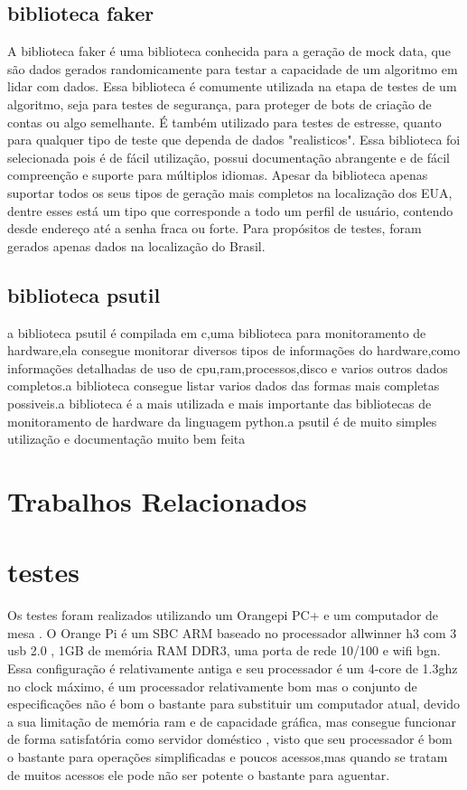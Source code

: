 \documentclass[
	12pt,				%
	openright,			%
	oneside,			%
	a4paper,			%
	english,			%
	french,				%
	spanish,			%
	brazil,				%
	]{abntex2}
\begin{document}
\section{biblioteca faker}
\label{sec:biblioteca faker}
A biblioteca faker é uma biblioteca conhecida para a geração de mock data, que são dados gerados randomicamente para testar a capacidade de um algoritmo em lidar com dados. Essa biblioteca é comumente utilizada na etapa de testes de um algoritmo, seja para testes de segurança, para proteger de bots de criação de contas ou algo semelhante. É também utilizado para testes de estresse, quanto para qualquer tipo de teste que dependa de dados "realisticos".\newline
Essa biblioteca foi selecionada pois é de fácil utilização, possui documentação abrangente e de fácil compreenção e suporte para múltiplos idiomas. Apesar da biblioteca apenas suportar todos os seus tipos de geração mais completos na localização dos EUA, dentre esses está um tipo que corresponde a todo um perfil de usuário, contendo desde endereço até a senha fraca ou forte. Para propósitos de testes, foram gerados apenas dados na localização do Brasil.\newline

\section{biblioteca psutil}
\label{sec:biblioteca psutil}
a biblioteca psutil é compilada em c,uma biblioteca para monitoramento de hardware,ela consegue monitorar diversos tipos de informações do hardware,como informações detalhadas de uso de cpu,ram,processos,disco e varios outros dados completos.a biblioteca consegue listar varios dados das formas mais completas possiveis.a biblioteca é a mais utilizada e mais importante das bibliotecas de monitoramento de hardware da linguagem python.a psutil é de muito simples utilização e documentação muito bem feita

\chapter{Trabalhos Relacionados}
\label{ch: trabalhos relacionados}


\chapter{testes}
\label{ch: testes}
Os testes foram realizados utilizando um Orangepi PC+ e um computador de mesa .
O Orange Pi é um SBC ARM baseado no processador allwinner h3 com 3 usb 2.0 , 1GB de memória RAM DDR3, uma porta de rede 10/100 e wifi bgn. Essa configuração é relativamente antiga e seu processador é um 4-core de 1.3ghz no clock máximo,
é um processador relativamente bom mas o conjunto de especificações não é bom o bastante para substituir um computador atual,
devido a sua limitação de memória ram e de capacidade gráfica, mas consegue funcionar de forma satisfatória como servidor doméstico ,
visto que seu processador é bom o bastante para operações simplificadas e poucos acessos,mas quando se tratam de muitos acessos ele pode não ser potente o bastante para aguentar.
\end{document}
